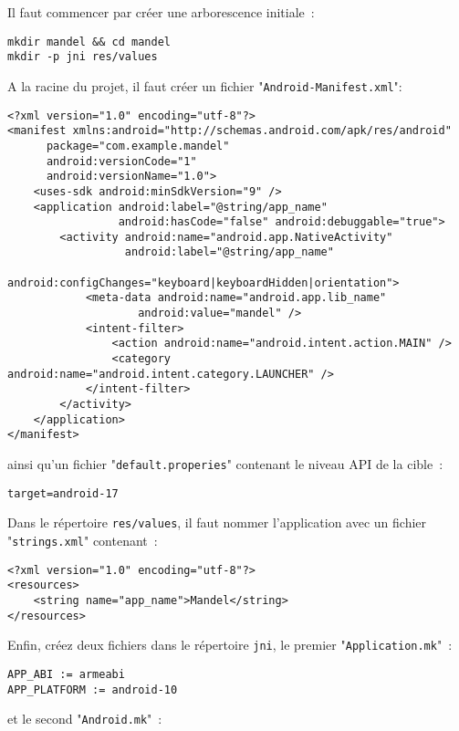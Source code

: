 \documentclass[a4paper]{article}
\theoremstyle{break}
\begin{document}
Il faut commencer par créer une arborescence initiale~:

\begin{verbatim}
mkdir mandel && cd mandel
mkdir -p jni res/values
\end{verbatim}

A la racine du projet, il faut créer un fichier 
"{\tt Android-Manifest.xml}":

\begin{verbatim}
<?xml version="1.0" encoding="utf-8"?>
<manifest xmlns:android="http://schemas.android.com/apk/res/android"
      package="com.example.mandel"
      android:versionCode="1"
      android:versionName="1.0">
    <uses-sdk android:minSdkVersion="9" />
    <application android:label="@string/app_name"
                 android:hasCode="false" android:debuggable="true">
        <activity android:name="android.app.NativeActivity"
                  android:label="@string/app_name"
                  android:configChanges="keyboard|keyboardHidden|orientation">
            <meta-data android:name="android.app.lib_name"
                    android:value="mandel" />
            <intent-filter>
                <action android:name="android.intent.action.MAIN" />
                <category android:name="android.intent.category.LAUNCHER" />
            </intent-filter>
        </activity>
    </application>
</manifest>
\end{verbatim}

ainsi qu'un fichier "{\tt default.properies}" contenant le niveau API
de la cible~:

\begin{verbatim}
target=android-17
\end{verbatim}

Dans le répertoire {\tt res/values}, il faut nommer l'application avec un fichier 
 "{\tt strings.xml}" contenant~:

\begin{verbatim}
<?xml version="1.0" encoding="utf-8"?>
<resources>
    <string name="app_name">Mandel</string>
</resources>
\end{verbatim}

Enfin, créez deux fichiers dans le répertoire {\tt jni}, 
le premier "{\tt Application.mk}"~:

\begin{verbatim}
APP_ABI := armeabi
APP_PLATFORM := android-10
\end{verbatim}

et le second "{\tt Android.mk}"~:
\end{document}
